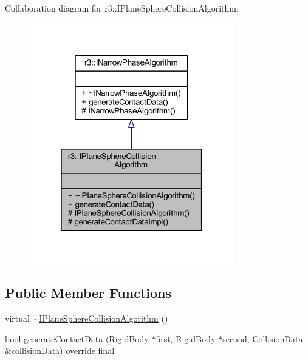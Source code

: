 Collaboration diagram for r3\+:\+:I\+Plane\+Sphere\+Collision\+Algorithm\+:\nopagebreak
\begin{figure}[H]
\begin{center}
\leavevmode
\includegraphics[width=253pt]{classr3_1_1_i_plane_sphere_collision_algorithm__coll__graph}
\end{center}
\end{figure}
\subsection*{Public Member Functions}
\begin{DoxyCompactItemize}
\item 
virtual \mbox{\hyperlink{classr3_1_1_i_plane_sphere_collision_algorithm_a25bd94a472e466de011c128012b8e938}{$\sim$\+I\+Plane\+Sphere\+Collision\+Algorithm}} ()
\item 
bool \mbox{\hyperlink{classr3_1_1_i_plane_sphere_collision_algorithm_a5b1c334d90d381e089d59cb59a7714c5}{generate\+Contact\+Data}} (\mbox{\hyperlink{classr3_1_1_rigid_body}{Rigid\+Body}} $\ast$first, \mbox{\hyperlink{classr3_1_1_rigid_body}{Rigid\+Body}} $\ast$second, \mbox{\hyperlink{classr3_1_1_collision_data}{Collision\+Data}} \&collision\+Data) override final
\end{DoxyCompactItemize}

